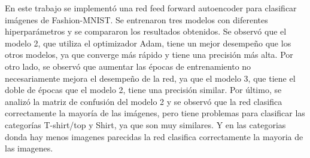 \documentclass[aps,prl,reprint,groupedaddress]{revtex4-2}
\begin{document}
En este trabajo se implementó una red feed forward autoencoder para clasificar
imágenes de Fashion-MNIST. Se entrenaron tres modelos con diferentes hiperparámetros
y se compararon los resultados obtenidos. Se observó que el modelo 2, que utiliza
el optimizador Adam, tiene un mejor desempeño que los otros modelos, ya que
converge más rápido y tiene una precisión más alta. Por otro lado, se observó que
aumentar las épocas de entrenamiento no necesariamente mejora el desempeño de la
red, ya que el modelo 3, que tiene el doble de épocas que el modelo 2, tiene una
precisión similar. Por último, se analizó la matriz de confusión del modelo 2 y se
observó que la red clasifica correctamente la mayoría de las imágenes, pero tiene
problemas para clasificar las categorías T-shirt/top y Shirt, ya que son muy
similares. Y en las categorias donda hay menos imagenes parecidas la red clasifica
correctamente la mayoria de las imagenes.




\end{document}
